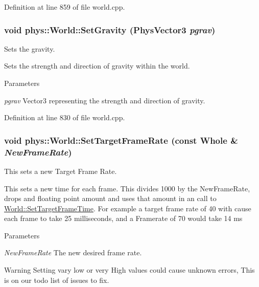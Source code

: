 Definition at line 859 of file world.cpp.

\hypertarget{classphys_1_1World_a3779f811ca8a394a20fc2d92823b5f93}{
\subsubsection[{SetGravity}]{\setlength{\rightskip}{0pt plus 5cm}void phys::World::SetGravity ({\bf PhysVector3} {\em pgrav})}}
\label{da/ddf/classphys_1_1World_a3779f811ca8a394a20fc2d92823b5f93}


Sets the gravity. 

Sets the strength and direction of gravity within the world. 
\begin{DoxyParams}{Parameters}
\item[{\em pgrav}]Vector3 representing the strength and direction of gravity. \end{DoxyParams}


Definition at line 830 of file world.cpp.

\hypertarget{classphys_1_1World_a76dfcde35392291aafd6eb1a64b3c95c}{
\subsubsection[{SetTargetFrameRate}]{\setlength{\rightskip}{0pt plus 5cm}void phys::World::SetTargetFrameRate (const {\bf Whole} \& {\em NewFrameRate})}}
\label{da/ddf/classphys_1_1World_a76dfcde35392291aafd6eb1a64b3c95c}


This sets a new Target Frame Rate. 

This sets a new time for each frame. This divides 1000 by the NewFrameRate, drops and floating point amount and uses that amount in an call to \hyperlink{classphys_1_1World_ad95b5a5ad73e0a05826b5bd834876333}{World::SetTargetFrameTime}. For example a target frame rate of 40 with cause each frame to take 25 milliseconds, and a Framerate of 70 would take 14 ms 
\begin{DoxyParams}{Parameters}
\item[{\em NewFrameRate}]The new desired frame rate. \end{DoxyParams}
\begin{DoxyWarning}{Warning}
Setting vary low or very High values could cause unknown errors, This is on our todo list of issues to fix. 
\end{DoxyWarning}


